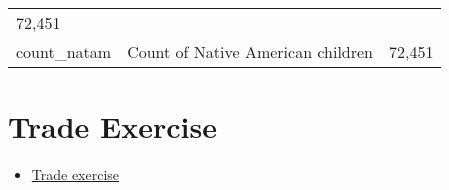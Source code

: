 \documentclass[]{book}
\providecommand{\tightlist}{%
  \setlength{\itemsep}{0pt}\setlength{\parskip}{0pt}}
\begin{document}
\begin{longtable}[]{@{}lll@{}}
\begin{minipage}[t]{0.04\columnwidth}
72,451\strut
\end{minipage}\tabularnewline
\begin{minipage}[t]{0.04\columnwidth}\raggedright\strut
count\_natam\strut
\end{minipage} & \begin{minipage}[t]{0.04\columnwidth}\raggedright\strut
Count of Native American children\strut
\end{minipage} & \begin{minipage}[t]{0.04\columnwidth}\raggedright\strut
72,451\strut
\end{minipage}\tabularnewline
\bottomrule
\end{longtable}

\section{Trade Exercise}\label{trade-exercise}

\begin{itemize}
\tightlist
\item
  \href{images/trade.html}{Trade exercise}
\end{itemize}


\end{document}
